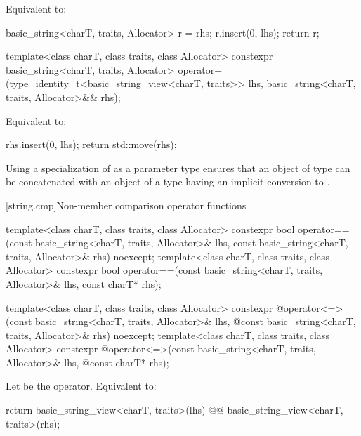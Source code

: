 \begin{itemdescr}
\pnum
Equivalent to:
\begin{codeblock}
basic_string<charT, traits, Allocator> r = rhs;
r.insert(0, lhs);
return r;
\end{codeblock}
\end{itemdescr}

%
\begin{itemdecl}
template<class charT, class traits, class Allocator>
  constexpr basic_string<charT, traits, Allocator>
    operator+(type_identity_t<basic_string_view<charT, traits>> lhs,
              basic_string<charT, traits, Allocator>&& rhs);
\end{itemdecl}

\begin{itemdescr}
\pnum
Equivalent to:
\begin{codeblock}
rhs.insert(0, lhs);
return std::move(rhs);
\end{codeblock}
\end{itemdescr}

\pnum
\begin{note}
Using a specialization of  as a parameter type ensures
that an object of type 
can be concatenated with an object of a type 
having an implicit conversion to
.
\end{note}

[string.cmp]{Non-member comparison operator functions}
\begin{itemdecl}
template<class charT, class traits, class Allocator>
  constexpr bool
    operator==(const basic_string<charT, traits, Allocator>& lhs,
               const basic_string<charT, traits, Allocator>& rhs) noexcept;
template<class charT, class traits, class Allocator>
  constexpr bool operator==(const basic_string<charT, traits, Allocator>& lhs,
                            const charT* rhs);

template<class charT, class traits, class Allocator>
  constexpr @\seebelow@ operator<=>(const basic_string<charT, traits, Allocator>& lhs,
            @\itcorr@                      const basic_string<charT, traits, Allocator>& rhs) noexcept;
template<class charT, class traits, class Allocator>
  constexpr @\seebelow@ operator<=>(const basic_string<charT, traits, Allocator>& lhs,
            @\itcorr@                      const charT* rhs);
\end{itemdecl}
\begin{itemdescr}
\pnum
\effects
Let  be the operator.
Equivalent to:
\begin{codeblock}
return basic_string_view<charT, traits>(lhs) @@ basic_string_view<charT, traits>(rhs);
\end{codeblock}
\end{itemdescr}

